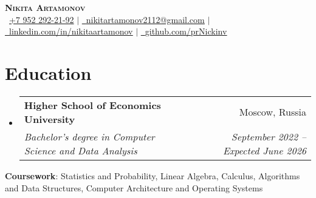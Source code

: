 \documentclass[letterpaper,11pt]{article}
\makeatletter
\newcommand{\resumeSubheading}[4]{
  \vspace{-2pt}\item
    \begin{tabular*}{0.97\textwidth}[t]{l@{\extracolsep{\fill}}r}
      \textbf{#1} & #2 \\
      \textit{\small#3} & \textit{\small #4} \\
    \end{tabular*}\vspace{-7pt}
}
\newcommand{\resumeSubHeadingListStart}{\begin{itemize}[leftmargin=0.15in, label={}]}
\newcommand{\resumeSubHeadingListEnd}{\end{itemize}}
\makeatother
\begin{document}

\begin{center}
    \textbf{\Huge \scshape Nikita Artamonov} \\ \vspace{1pt}
    \small \faMobile\ \underline{+7 952 292-21-92} $|$ \href{mailto:nikitartamonov2112@gmail.com}{\raisebox{-0.2\height}\faEnvelope\ \underline{nikitartamonov2112@gmail.com}} $|$ 
    \href{https://www.linkedin.com/in/nikitaartamonov/}{\raisebox{-0.2\height}\faLinkedin\ \underline{linkedin.com/in/nikitaartamonov}} $|$
    \href{https://github.com/prNickinv}{\raisebox{-0.2\height}\faGithub\ \underline{github.com/prNickinv}}
\end{center}


\section{Education}
  \resumeSubHeadingListStart
    \resumeSubheading
      {Higher School of Economics University }{Moscow, Russia}
      {Bachelor’s degree in Computer Science and Data Analysis}{September 2022 -- Expected June 2026}
  \resumeSubHeadingListEnd

   \begin{itemize}[leftmargin=0.15in, label={}]
    \small{\item{
     \textbf{Coursework}{: Statistics and Probability, Linear Algebra, Calculus, Algorithms and Data Structures, Computer Architecture and Operating Systems} \\
    }}
 \end{itemize}

 
\end{document}
